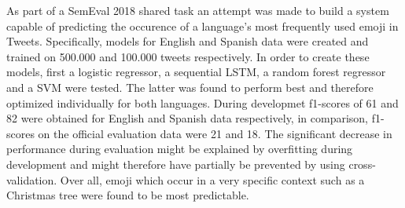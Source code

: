 As part of a SemEval 2018 shared task an attempt was made to build a system capable of predicting the occurence of a language's most frequently used emoji in Tweets. Specifically, models for English and Spanish data were created and trained on 500.000 and 100.000 tweets respectively. In order to create these models, first a logistic regressor, a sequential LSTM, a random forest regressor and a SVM were tested. The latter was found to perform best and therefore optimized individually for both languages. During developmet f1-scores of 61 and 82 were obtained for English and Spanish data respectively, in comparison, f1-scores on the official evaluation data were 21 and 18. The significant decrease in performance during evaluation might be explained by overfitting during development and might therefore have partially be prevented by using cross-validation. Over all, emoji which occur in a very specific context such as a Christmas tree were found to be most predictable.
